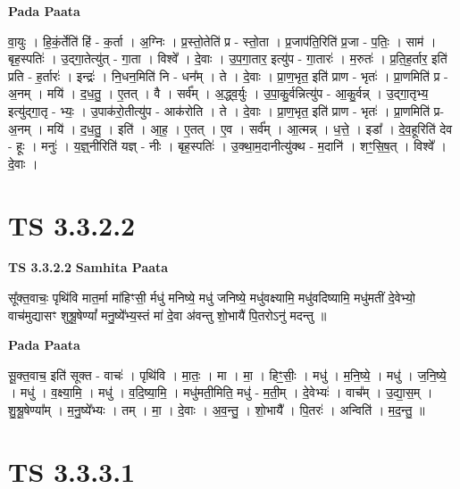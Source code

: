 \documentclass[17pt]{extarticle}
\begin{document}
\textbf{Pada Paata} \newline

वा॒युः । हि॒कं॒र्तेति॑ हिं - क॒र्ता । अ॒ग्निः । प्र॒स्तो॒तेति॑ प्र - स्तो॒ता । प्र॒जाप॑ति॒रिति॑ प्र॒जा - प॒तिः॒ । साम॑ । बृह॒स्पतिः॑ । उ॒द्गा॒तेत्यु॑त् - गा॒ता । विश्वे᳚ । दे॒वाः । उ॒प॒गा॒तार॒ इत्यु॑प - गा॒तारः॑ । म॒रुतः॑ । प्र॒ति॒ह॒र्तार॒ इति॑ प्रति - ह॒र्तारः॑ । इन्द्रः॑ । नि॒धन॒मिति॑ नि - धन᳚म् । ते । दे॒वाः । प्रा॒ण॒भृत॒ इति॑ प्राण - भृतः॑ । प्रा॒णमिति॑ प्र - अ॒नम् । मयि॑ । द॒ध॒तु॒ । ए॒तत् । वै । सर्व᳚म् । अ॒द्ध्व॒र्युः । उ॒पा॒कु॒र्वन्नित्यु॑प - आ॒कु॒र्वन्न् । उ॒द्गा॒तृभ्य॒ इत्यु॑द्गा॒तृ - भ्यः॒ । उ॒पाक॑रो॒तीत्यु॑प - आक॑रोति । ते । दे॒वाः । प्रा॒ण॒भृत॒ इति॑ प्राण - भृतः॑ । प्रा॒णमिति॑ प्र-अ॒नम् । मयि॑ । द॒ध॒तु॒ । इति॑ । आ॒ह॒ । ए॒तत् । ए॒व । सर्व᳚म् । आ॒त्मन्न् । ध॒त्ते॒ । इडा᳚ । दे॒व॒हूरिति॑ देव - हूः । मनुः॑ । य॒ज्ञ्॒नीरिति॑ यज्ञ् - नीः । बृह॒स्पतिः॑ । उ॒क्था॒म॒दानीत्यु॑क्थ - म॒दानि॑ । शꣳ॒॒सि॒ष॒त् । विश्वे᳚ । दे॒वाः ।  \newline





\section{ TS 3.3.2.2 }

\textbf{TS 3.3.2.2 } \newline
\textbf{Samhita Paata} \newline

सू᳚क्त॒वाचः॒ पृथि॑वि मात॒र्मा मा॑हिꣳसी॒ र्मधु॑ मनिष्ये॒ मधु॑ जनिष्ये॒ मधु॑वक्ष्यामि॒ मधु॑वदिष्यामि॒ मधु॑मतीं दे॒वेभ्यो॒ वाच॑मुद्यासꣳ शुश्रू॒षेण्यां᳚ मनु॒ष्ये᳚भ्य॒स्तं मा॑ दे॒वा अ॑वन्तु शो॒भायै॑ पि॒तरोऽनु॑ मदन्तु ॥ \newline

\textbf{Pada Paata} \newline

सू॒क्त॒वाच॒ इति॑ सूक्त - वाचः॑ । पृथि॑वि । मा॒तः॒ । मा । मा॒ । हिꣳ॒॒सीः॒ । मधु॑ । म॒नि॒ष्ये॒ । मधु॑ । ज॒नि॒ष्ये॒ । मधु॑ । व॒क्ष्या॒मि॒ । मधु॑ । व॒दि॒ष्या॒मि॒ । मधु॑मती॒मिति॒ मधु॑ - म॒ती॒म् । दे॒वेभ्यः॑ । वाच᳚म् । उ॒द्या॒स॒म् । शु॒श्रू॒षेण्या᳚म् । म॒नु॒ष्ये᳚भ्यः । तम् । मा॒ । दे॒वाः । अ॒व॒न्तु॒ । शो॒भायै᳚ । पि॒तरः॑ । अन्विति॑ । म॒द॒न्तु॒ ॥  \newline





\section{ TS 3.3.3.1 }
\end{document}
